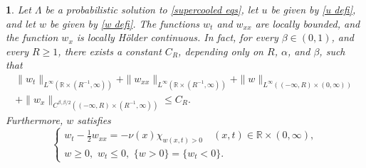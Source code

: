 \documentclass{article}
\numberwithin{equation}{section}
\numberwithin{figure}{section}
\theoremstyle{plain}
\theoremstyle{plain}
\newtheorem{prop}[thm]{\protect\propositionname}
\theoremstyle{plain}
\theoremstyle{plain}
\theoremstyle{definition}
\theoremstyle{remark}
\def\R{{\mathbb{R}}}
\providecommand{\propositionname}{Proposition}
\begin{document}
\begin{prop} \label{prop: w eq} Let $\Lambda$ be a probabilistic solution to \eqref{supercooled eqs}, let $u$ be given by \eqref{u defi}, and let $w$ be given by \eqref{w defi}.  The functions $w_t$ and $w_{xx}$ are locally bounded, and the function $w_x$ is locally H\"older continuous. In fact, for every $\beta \in (0,1)$, and every $R\geq 1$, there exists a constant $C_R$, depending only on $R$, $\alpha$, and $\beta$, such that
\begin{multline}\|w_t\|_{L^{\infty}(\R\times (R^{-1},\infty))}+\|w_{xx}\|_{L^{\infty}(\R \times (R^{-1},\infty))}+\|w\|_{L^{\infty}((-\infty,R)\times(0,\infty))}\\+\|w_x\|_{C^{\beta,\beta/2}((-\infty,R)\times(R^{-1},\infty))}\leq C_R.\end{multline}
Furthermore, $w$ satisfies
\begin{equation} \label{w equation}
   \begin{cases} w_t-\frac{1}{2}w_{xx}=-\nu(x)\chi_{w(x,t)>0}\quad (x,t)\in \R\times (0,\infty),\\
   w\geq 0,\,\, w_t\leq0, \,\,\{w>0\}=\{w_t<0\}.
   \end{cases}
\end{equation}

\end{prop}
\end{document}
